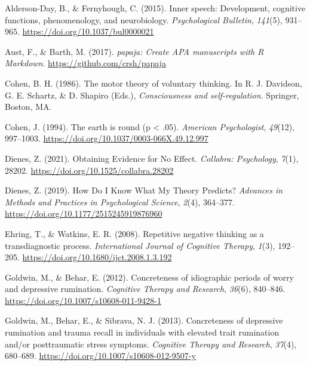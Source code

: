 \documentclass[
  man, donotrepeattitle,floatsintext]{apa6}
\newlength{\cslhangindent}
\newlength{\cslentryspacingunit} %
\newenvironment{CSLReferences}[2] %
 {%
  \setlength{\parindent}{0pt}
  \ifodd #1
  \let\oldpar\par
  \def\par{\hangindent=\cslhangindent\oldpar}
  \fi
  \setlength{\parskip}{#2\cslentryspacingunit}
 }%
 {}
\begin{document}
\hypertarget{refs}{}
\begin{CSLReferences}{1}{0}
\leavevmode{}%
Alderson-Day, B., \& Fernyhough, C. (2015). Inner speech: {Development}, cognitive functions, phenomenology, and neurobiology. \emph{Psychological Bulletin}, \emph{141}(5), 931--965. \url{https://doi.org/10.1037/bul0000021}

\leavevmode{}%
Aust, F., \& Barth, M. (2017). \emph{{papaja}: {Create} {APA} manuscripts with {R Markdown}}. \url{https://github.com/crsh/papaja}

\leavevmode{}%
Cohen, B. H. (1986). The motor theory of voluntary thinking. In R. J. Davidson, G. E. Schartz, \& D. Shapiro (Eds.), \emph{Consciousness and self-regulation}. Springer, Boston, MA.

\leavevmode{}%
Cohen, J. (1994). The earth is round (p {\textless{}} .05). \emph{American Psychologist}, \emph{49}(12), 997--1003. \url{https://doi.org/10.1037/0003-066X.49.12.997}

\leavevmode{}%
Dienes, Z. (2021). Obtaining {Evidence} for {No} {Effect}. \emph{Collabra: Psychology}, \emph{7}(1), 28202. \url{https://doi.org/10.1525/collabra.28202}

\leavevmode{}%
Dienes, Z. (2019). How {Do} {I} {Know} {What} {My} {Theory} {Predicts}? \emph{Advances in Methods and Practices in Psychological Science}, \emph{2}(4), 364--377. \url{https://doi.org/10.1177/2515245919876960}

\leavevmode{}%
Ehring, T., \& Watkins, E. R. (2008). Repetitive negative thinking as a transdiagnostic process. \emph{International Journal of Cognitive Therapy}, \emph{1}(3), 192--205. \url{https://doi.org/10.1680/ijct.2008.1.3.192}

\leavevmode{}%
Goldwin, M., \& Behar, E. (2012). Concreteness of idiographic periods of worry and depressive rumination. \emph{Cognitive Therapy and Research}, \emph{36}(6), 840--846. \url{https://doi.org/10.1007/s10608-011-9428-1}

\leavevmode{}%
Goldwin, M., Behar, E., \& Sibrava, N. J. (2013). Concreteness of depressive rumination and trauma recall in individuals with elevated trait rumination and/or posttraumatic stress symptoms. \emph{Cognitive Therapy and Research}, \emph{37}(4), 680--689. \url{https://doi.org/10.1007/s10608-012-9507-y}


\end{CSLReferences}
\end{document}
